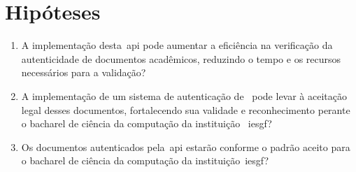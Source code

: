 \section{Hipóteses}\label{sec:hipoteses}

\begin{enumerate}[label=\alph*)]
    \item A implementação desta~\acrshort{api} pode aumentar a eficiência na
    verificação da autenticidade de documentos acadêmicos, reduzindo o tempo e
    os recursos necessários para a validação?
    \item A implementação de um sistema de autenticação de~ pode
    levar à aceitação legal desses documentos, fortalecendo sua validade e
    reconhecimento perante o bacharel de ciência da computação da instituição
    ~\acrshort{iesgf}?
    \item Os documentos autenticados pela~\acrshort{api} estarão conforme o padrão
    aceito para o bacharel de ciência da computação da instituição~\acrshort{iesgf}?
\end{enumerate}